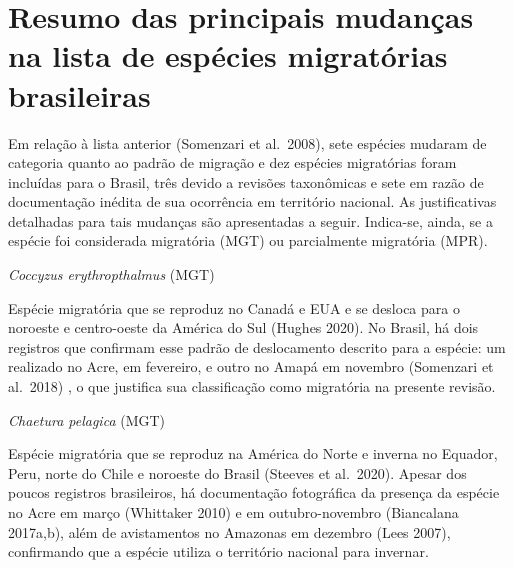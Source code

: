 \documentclass[
  oneside]{scrbook}
\begin{document}
\hypertarget{resumo-das-principais-mudanuxe7as-na-lista-de-espuxe9cies-migratuxf3rias-brasileiras}{%
\section{Resumo das principais mudanças na lista de espécies migratórias brasileiras}\label{resumo-das-principais-mudanuxe7as-na-lista-de-espuxe9cies-migratuxf3rias-brasileiras}}

Em relação à lista anterior (Somenzari et al.~2008), sete espécies mudaram de categoria quanto ao padrão de migração e dez espécies migratórias foram incluídas para o Brasil, três devido a revisões taxonômicas e sete em razão de documentação inédita de sua ocorrência em território nacional. As justificativas detalhadas para tais mudanças são apresentadas a seguir. Indica-se, ainda, se a espécie foi considerada migratória (MGT) ou parcialmente migratória (MPR).

\begin{blackbox}
\emph{Coccyzus erythropthalmus} (MGT)

Espécie migratória que se reproduz no Canadá e EUA e se desloca para o noroeste e centro-oeste da América do Sul (Hughes 2020). No Brasil, há dois registros que confirmam esse padrão de deslocamento descrito para a espécie: um realizado no Acre, em fevereiro, e outro no Amapá em novembro (Somenzari et al.~2018) , o que justifica sua classificação como migratória na presente revisão.

\end{blackbox}

\begin{blackbox}
\emph{Chaetura pelagica} (MGT)

Espécie migratória que se reproduz na América do Norte e inverna no Equador, Peru, norte do Chile e noroeste do Brasil (Steeves et al.~2020). Apesar dos poucos registros brasileiros, há documentação fotográfica da presença da espécie no Acre em março (Whittaker 2010) e em outubro-novembro (Biancalana 2017a,b), além de avistamentos no Amazonas em dezembro (Lees 2007), confirmando que a espécie utiliza o território nacional para invernar.

\end{blackbox}
\end{document}
